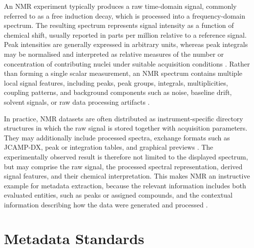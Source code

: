An NMR experiment typically produces a raw time-domain signal, commonly referred to as a free induction decay, which is processed into a frequency-domain spectrum.
The resulting spectrum represents signal intensity as a function of chemical shift, usually reported in parts per million relative to a reference signal.
Peak intensities are generally expressed in arbitrary units, whereas peak integrals may be normalised and interpreted as relative measures of the number or concentration of contributing nuclei under suitable acquisition conditions \cite{Schober2018nmrML}.
Rather than forming a single scalar measurement, an NMR spectrum contains multiple local signal features, including peaks, peak groups, integrals, multiplicities, coupling patterns, and background components such as noise, baseline drift, solvent signals, or raw data processing artifacts \cite{Schober2018nmrML}.

In practice, NMR datasets are often distributed as instrument-specific directory structures in which the raw signal is stored together with acquisition parameters.
They may additionally include processed spectra, exchange formats such as JCAMP-DX, peak or integration tables, and graphical previews \cite{Schober2018nmrML,steinbeck2023nfdi4chem}.
The experimentally observed result is therefore not limited to the displayed spectrum, but may comprise the raw signal, the processed spectral representation, derived signal features, and their chemical interpretation.
This makes NMR an instructive example for metadata extraction, because the relevant information includes both evaluated entities, such as peaks or assigned compounds, and the contextual information describing how the data were generated and processed \cite{Schober2018nmrML,steinbeck2023nfdi4chem}.


\section{Metadata Standards}
\label{sec:metadata-standards}

